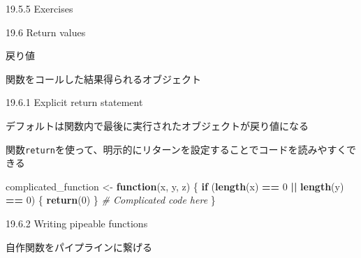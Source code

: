 \documentclass[ignorenonframetext,]{beamer}
\newenvironment{Shaded}{\begin{snugshade}}{\end{snugshade}}
\newcommand{\KeywordTok}[1]{\textcolor[rgb]{0.13,0.29,0.53}{\textbf{#1}}}
\newcommand{\DecValTok}[1]{\textcolor[rgb]{0.00,0.00,0.81}{#1}}
\newcommand{\StringTok}[1]{\textcolor[rgb]{0.31,0.60,0.02}{#1}}
\newcommand{\CommentTok}[1]{\textcolor[rgb]{0.56,0.35,0.01}{\textit{#1}}}
\newcommand{\ControlFlowTok}[1]{\textcolor[rgb]{0.13,0.29,0.53}{\textbf{#1}}}
\newcommand{\OperatorTok}[1]{\textcolor[rgb]{0.81,0.36,0.00}{\textbf{#1}}}
\newcommand{\NormalTok}[1]{#1}
\begin{document}
\begin{frame}{19.5.5 Exercises}

\end{frame}

\begin{frame}{19.6 Return values}

戻り値

関数をコールした結果得られるオブジェクト

\end{frame}

\begin{frame}[fragile]{19.6.1 Explicit return statement}

デフォルトは関数内で最後に実行されたオブジェクトが戻り値になる

関数\texttt{return}を使って、明示的にリターンを設定することでコードを読みやすくできる

\begin{Shaded}
\begin{Highlighting}[]
\NormalTok{complicated_function <-}\StringTok{ }\ControlFlowTok{function}\NormalTok{(x, y, z) \{}
  \ControlFlowTok{if}\NormalTok{ (}\KeywordTok{length}\NormalTok{(x) }\OperatorTok{==}\StringTok{ }\DecValTok{0} \OperatorTok{||}\StringTok{ }\KeywordTok{length}\NormalTok{(y) }\OperatorTok{==}\StringTok{ }\DecValTok{0}\NormalTok{) \{}
    \KeywordTok{return}\NormalTok{(}\DecValTok{0}\NormalTok{)}
\NormalTok{  \} }
  \CommentTok{# Complicated code here}
\NormalTok{\}}
\end{Highlighting}
\end{Shaded}

\end{frame}

\begin{frame}{19.6.2 Writing pipeable functions}

自作関数をパイプラインに繋げる

\end{frame}
\end{document}
